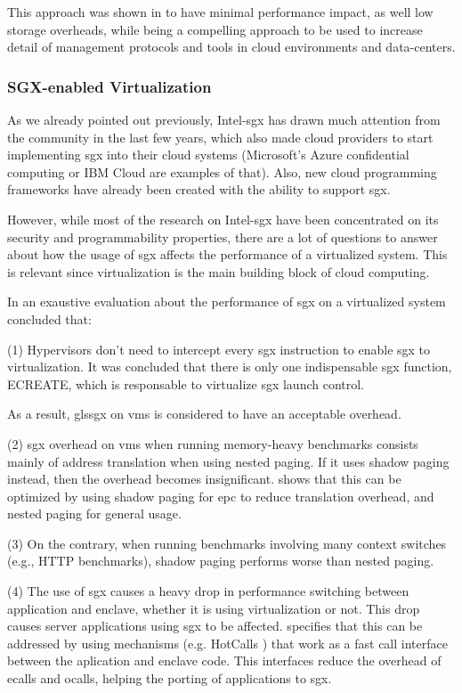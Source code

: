 This approach was shown in \cite{sgxCloudThesis} to have minimal performance impact, as well low storage overheads, while being a compelling approach to be used to increase detail of management protocols and tools in cloud environments and data-centers.


\subsubsection{SGX-enabled Virtualization}

As we already pointed out previously, Intel-\gls{sgx} has drawn much attention from the community in the last few years, which also made cloud providers to start implementing \gls{sgx} into their cloud systems (Microsoft's Azure confidential computing or IBM Cloud are examples of that). Also, new cloud programming frameworks have already been created with the ability to support \gls{sgx}. 

However, while most of the research on Intel-\gls{sgx} have been concentrated on its security and programmability properties, there are a lot of questions to answer about how the usage of \gls{sgx} affects the performance of a virtualized system. This is relevant since virtualization is the main building block of cloud computing.

In \cite{sgxVirtualizationPaper} an exaustive evaluation about the performance of \gls{sgx} on a virtualized system concluded that:

(1) Hypervisors don't need to intercept every \gls{sgx} instruction to enable \gls{sgx} to virtualization. It was concluded that there is only one indispensable \gls{sgx} function, ECREATE, which is responsable to virtualize \gls{sgx} launch control.

As a result, gls{sgx} on \gls{vm}s is considered to have an acceptable overhead.

(2)  \gls{sgx} overhead on \gls{vm}s when running memory-heavy benchmarks consists mainly of address translation when using nested paging. If it uses shadow paging instead, then the overhead becomes insignificant. 
\cite{sgxVirtualizationPaper} shows that this can be optimized by using shadow paging for \gls{epc} to reduce translation overhead, and nested paging for general usage.

(3) On the contrary, when running benchmarks involving many context switches (e.g., HTTP benchmarks), shadow paging performs worse than nested paging.

(4) The use of \gls{sgx} causes a heavy drop in performance switching between application and enclave, whether it is using virtualization or not. This drop causes server applications using \gls{sgx} to be affected.
\cite{sgxVirtualizationPaper} specifies that this can be addressed by using mechanisms (e.g. HotCalls \cite{hotcallsPaper}) that work as a fast call interface between the aplication and enclave code. This interfaces reduce the overhead of ecalls and ocalls, helping the porting of applications to \gls{sgx}.

